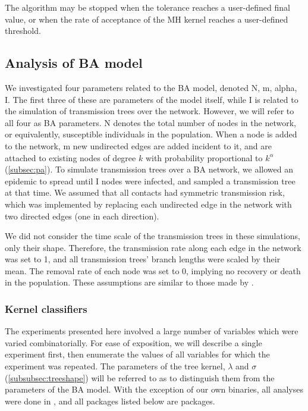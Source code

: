 The algorithm may be stopped when the tolerance reaches a user-defined final
value, or when the rate of acceptance of the \gls{MH} kernel reaches a
user-defined threshold. 

\subsection{Analysis of \acrlong{BA} model}

We investigated four parameters related to the \gls{BA} model, denoted
\gls{N}, \gls{m}, \gls{alpha}, \gls{I}. The first three of these are parameters
of the model itself, while \gls{I} is related to the simulation of transmission
trees over the network. However, we will refer to all four as \gls{BA}
parameters. \gls{N} denotes the total number of nodes in the network, or
equivalently, susceptible individuals in the population. When a node is added
to the network, \gls{m} new undirected edges are added incident to it, and are
attached to existing nodes of degree $k$ with probability proportional to
$k^\alpha$ (\cref{subsec:pa}). To simulate transmission trees over a
\gls{BA} network, we allowed an epidemic to spread until \gls{I} nodes were
infected, and sampled a transmission tree at that time. We assumed that all
contacts had symmetric transmission risk, which was implemented by replacing
each undirected edge in the network with two directed edges (one in each
direction).

We did not consider the time scale of the transmission trees in these
simulations, only their shape. Therefore, the transmission rate along each edge
in the network was set to 1, and all transmission trees' branch lengths were
scaled by their mean. The removal rate of each node was set to 0, implying no
recovery or death in the population. These assumptions are similar to those
made by \textcite{leventhal2012inferring}.

\subsubsection*{Kernel classifiers}
\label{subsec:kernel}

The experiments presented here involved a large number of variables which were
varied combinatorially. For ease of exposition, we will describe a single
experiment first, then enumerate the values of all variables for which the
experiment was repeated. The parameters of the tree kernel, $\lambda$ and
$\sigma$ (\cref{subsubsec:treeshape}) will be referred to as
 to distinguish them from the parameters of the \gls{BA}
model. With the exception of our own binaries, all analyses were done in
, and all packages listed below are  packages.


